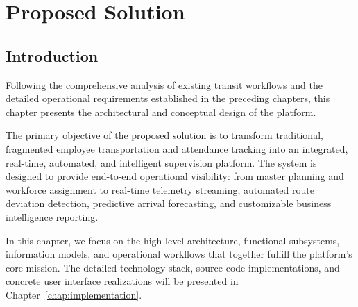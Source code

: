 \chapter{Proposed Solution}
\label{chap:proposed_solution}

\section{Introduction}
\label{sec:solution_intro}

Following the comprehensive analysis of existing transit workflows and the detailed operational requirements established in the preceding chapters, this chapter presents the architectural and conceptual design of the  platform. 

The primary objective of the proposed solution is to transform traditional, fragmented employee transportation and attendance tracking into an integrated, real-time, automated, and intelligent supervision platform. The system is designed to provide end-to-end operational visibility: from master planning and workforce assignment to real-time telemetry streaming, automated route deviation detection, predictive arrival forecasting, and customizable business intelligence reporting.

In this chapter, we focus on the high-level architecture, functional subsystems, information models, and operational workflows that together fulfill the platform's core mission. The detailed technology stack, source code implementations, and concrete user interface realizations will be presented in Chapter~\ref{chap:implementation}.

